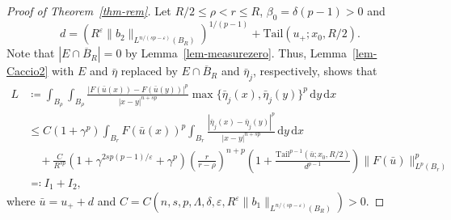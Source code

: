 \documentclass[11pt]{amsart}
\theoremstyle{plain}
\theoremstyle{definition}
\numberwithin{equation}{section}
\begin{document}
\begin{proof}[Proof of Theorem~\ref{thm-rem}]
Let $R/2\leq \rho<r\leq R$, $\beta_0=\delta(p-1)>0$ and
\begin{equation*}
d=\left( R^{\varepsilon}\|b_2\|_{L^{n/(sp-\varepsilon)}(B_{R})} \right)^{1/(p-1)}+\mathrm{Tail}(u_+; x_0, R/2).
\end{equation*}
Note that $|E \cap \overline{B}_R|=0$ by Lemma~\ref{lem-measurezero}. Thus, Lemma~\ref{lem-Caccio2} with $E$ and $\bar{\eta}$ replaced by $E \cap \overline{B}_R$ and $\bar{\eta}_j$, respectively, shows that
\begin{equation*}
\begin{split}
L&\coloneqq \int_{B_\rho} \int_{B_\rho} \frac{|F(\bar{u}(x))-F(\bar{u}(y))|^p}{|x-y|^{n+sp}} \max\{ \bar{\eta}_j(x), \bar{\eta}_j(y) \}^p \,\mathrm{d}y \,\mathrm{d}x \\
&\leq C(1+\gamma^p) \int_{B_r} F(\bar{u}(x))^p \int_{B_r} \frac{|\bar{\eta}_j(x)-\bar{\eta}_j(y)|^p}{|x-y|^{n+sp}} \,\mathrm{d}y\,\mathrm{d}x \\
&\quad + \frac{C}{R^{sp}} \left( 1+\gamma^{2sp(p-1)/\varepsilon} + \gamma^p \right) \left( \frac{r}{r-\rho} \right)^{n+p} \left( 1+\frac{\mathrm{Tail}^{p-1}(\bar{u}; x_0, R/2)}{d^{p-1}} \right) \|F(\bar{u})\|_{L^p(B_r)}^p \\
&\eqqcolon I_1 + I_2,
\end{split}
\end{equation*}
where $\bar{u}=u_++d$ and $C=C(n, s, p, \Lambda, \delta, \varepsilon, R^\varepsilon\|b_1\|_{L^{n/(sp-\varepsilon)}(B_{R})})>0$.


\end{proof}
\end{document}
